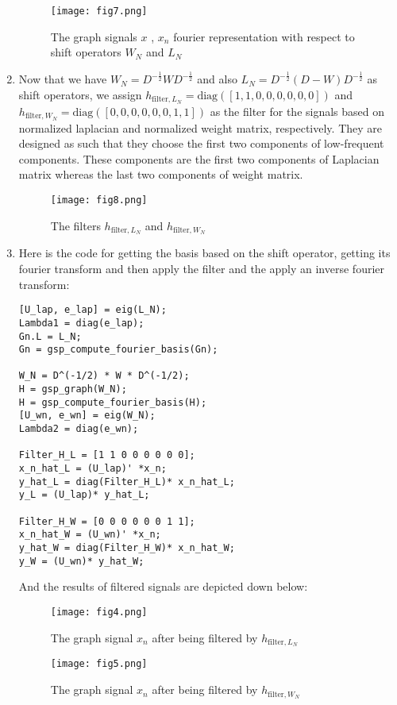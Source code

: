 \documentclass{article}
\begin{document}
\begin{enumerate}
     \begin{figure}[h!]
        \centering
        \texttt{[image: fig7.png]} 
        \caption{The graph signals $x$ , $x_n$ fourier representation with respect to shift operators $W_N$ and $L_N$}
        \label{fig:gr4}
    \end{figure}
    \item Now that we have $W_N = D^{-\frac{1}{2}} W  D^{-\frac{1}{2}}$ and also $L_N =  D^{-\frac{1}{2}} (D - W)  D^{-\frac{1}{2}}$ as shift operators, we assign $h_{\text{filter},L_N} = \text{diag}([1, 1, 0, 0, 0, 0, 0, 0])$ and $h_{\text{filter},W_N} = \text{diag}([0, 0, 0, 0, 0, 0, 1, 1])$ as the filter for the signals based on normalized laplacian and normalized weight matrix, respectively. They are designed as such that they choose the first two components of low-frequent components. These components are the first two components of Laplacian matrix whereas the last two components of weight matrix.
    \newpage
    
    \begin{figure}[h!]
        \centering
        \texttt{[image: fig8.png]} 
        \caption{The  filters $h_{\text{filter},L_N}$ and 
        $h_{\text{filter},W_N}$ 
        }
        \label{fig:gr5}
    \end{figure}
    \item 
    Here is the code for getting the basis based on the shift operator, getting its fourier transform and then apply the filter and the apply an inverse fourier transform:

\begin{lstlisting}
[U_lap, e_lap] = eig(L_N);
Lambda1 = diag(e_lap);
Gn.L = L_N;
Gn = gsp_compute_fourier_basis(Gn);

W_N = D^(-1/2) * W * D^(-1/2);
H = gsp_graph(W_N);
H = gsp_compute_fourier_basis(H);
[U_wn, e_wn] = eig(W_N);
Lambda2 = diag(e_wn);

Filter_H_L = [1 1 0 0 0 0 0 0];
x_n_hat_L = (U_lap)' *x_n;
y_hat_L = diag(Filter_H_L)* x_n_hat_L;
y_L = (U_lap)* y_hat_L;

Filter_H_W = [0 0 0 0 0 0 1 1];
x_n_hat_W = (U_wn)' *x_n;
y_hat_W = diag(Filter_H_W)* x_n_hat_W;
y_W = (U_wn)* y_hat_W;
\end{lstlisting}

    And the results of filtered signals are depicted down below:

    \newpage
    
    \begin{figure}[h!]
        \centering
        \texttt{[image: fig4.png]} 
        \caption{The graph signal $x_n$ after being filtered by $h_{\text{filter},L_N}$}
        \label{fig:gr5}
    \end{figure}
    \begin{figure}[h!]
        \centering
        \texttt{[image: fig5.png]} 
        \caption{The graph signal $x_n$ after being filtered by $h_{\text{filter},W_N}$}
        \label{fig:gr5}
    \end{figure}


\end{enumerate}
\end{document}

